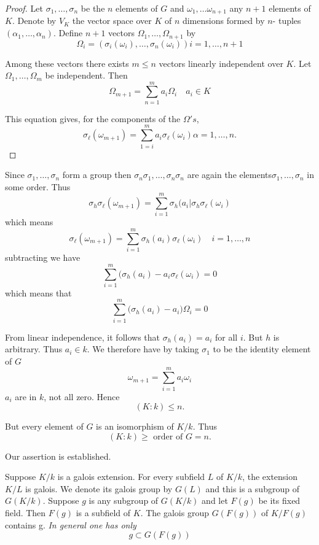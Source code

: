 \begin{proof}
Let $\sigma_1 , \ldots , \sigma_n$ be the $n$ elements of $G$ and
$\omega_1, \ldots \omega_{n+1}$ any $n+1$ elements of $K$. Denote by
$V_K$ the vector space over $K$ of $n$ dimensions formed by $n$- tuples
$(\alpha_1 , \ldots , \alpha_n)$. Define $n+1$ vectors $\Omega_1,
\ldots , \Omega_{n+1}$ by  
$$
\Omega_i = (\sigma_i (\omega_i), \ldots , \sigma_n (\omega_i)) i = 1, \ldots 
, n+1 
$$

Among these vectors there exists $m \le n$ vectors linearly
independent over $K$. Let $\Omega_1 , \ldots , \Omega_m$ be
independent. Then 
$$
\Omega_{m+1} = \sum^m_{n=1} a_i \Omega_i  \quad a_i \in K
$$

This equation gives, for the components of the $\Omega's$,
$$
\sigma_\ell (\omega_{m+1}) = \sum^m_{1=i} a_i \sigma_\ell (\omega_i)
\alpha = 1, \ldots ,n. 
$$
\end{proof}

Since $\sigma_1 , \ldots , \sigma_n$ form a group then $\sigma_n
\sigma_1, \ldots , \sigma_n \sigma_n$ are again the
elements\pageoriginale $\sigma_1 , \ldots , \sigma_n$ in some
order. Thus  
$$
\sigma_h \sigma_{\ell} (\omega_{m+1}) = \sum^m_{i=1} \sigma_h (a_i | \sigma_h 
\sigma_\ell(\omega_i) 
$$
which means 
$$
\sigma_\ell(\omega_{m+1}) = \sum^m_{i=1} \sigma_h (a_i)\sigma_\ell
(\omega_i)\quad i= 1, \ldots , n 
$$
subtracting we have
$$
\sum^m_{i=1} (\sigma_h (a_i)-a_i \sigma_\ell (\omega_i) = 0 
$$
which means that
$$
\sum^m_{i=1} \big( \sigma_h (a_i) - a_i \big) \Omega_i = 0  
$$

From linear independence, it follows that $\sigma_h(a_i) = a_i$ for
all $i$. But $h$ is arbitrary. Thus $a_i \in k$. We therefore have by
taking $\sigma_1$ to be the identity element of $G$ 
$$
\omega_{m+1} = \sum^m_{i=1} a_i \omega_i
$$
$a_i$ are in $k$, not all zero. Hence
$$
(K : k) \le n.
$$

But every element of $G$ is an isomorphism of $K/k$. Thus 
$$
(K : k) \ge \text{ order of } G = n.
$$

Our assertion is established.

Suppose $K/k $ is a galois extension. For every subfield $L$ of $K/k$,
the extension $K/L$ is galois. We denote its galois group by $G(L)$
and this is a subgroup of $G(K /k)$. Suppose $g$ is any subgroup of
$G(K/k)$ and let $F(g)$ be its fixed field. Then $F(g)$ is a subfield
of $K$. The galois group $G(F(g))$ of $K/F(g)$ contains\pageoriginale
g. \textit{In   general one has only} 
$$
g \subset G(F(g))
$$


